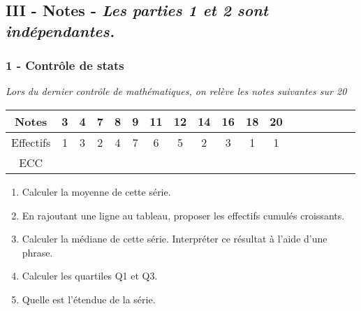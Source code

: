 \documentclass[11pt]{article}
\begin{document}
\subsection*{III - Notes - \textit{Les parties 1 et 2 sont indépendantes.} }

\subsubsection*{1 - Contrôle de stats}

\textit{Lors du dernier contrôle de mathématiques, on relève les notes suivantes sur 20}

\begin{center}
  \begin{tabular}{| c || c | c | c | c | c | c | c | c | c | c | c | c | c | c | c | c | c | }
    \hline
    Notes     & 3 & 4 & 7 & 8 & 9 & 11 & 12 & 14 & 16 & 18 & 20 \\
    \hline
    Effectifs & 1 & 3 & 2 & 4 & 7 & 6  & 5  & 2  & 3  & 1  & 1  \\
    \hline
    ECC       & \phantom{xxxxxx} & \phantom{xxxxxx} &\phantom{xxxxxx}  & \phantom{xxxxxx} & \phantom{xxxxxx} & \phantom{xxxxxx}  & \phantom{xxxxxx}  & \phantom{xxxxxx}  & \phantom{xxxxxx}  & \phantom{xxxxxx}  & \phantom{xxxxxx}  \\
    \hline
  \end{tabular}
\end{center}

\begin{multicols}{2}
  \begin{enumerate}
  \item[1.] Calculer la moyenne de cette série.
  \item[2.] En rajoutant une ligne au tableau, proposer les effectifs cumulés croissants.
  \item[3.] Calculer la médiane de cette série. Interpréter ce résultat à l'aide d'une phrase.
  \item[4.] Calculer les quartiles Q1 et Q3.
  \item[5.] Quelle est l'étendue de la série.
  \end{enumerate}
\end{multicols}
\end{document}
